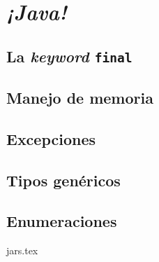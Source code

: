 \chapter{\textit{¡Java!}}
  \label{ch:java-2}
  \section{La \textit{keyword} \texttt{final}}
    \label{sec:final}
  \section{Manejo de memoria}
    \label{sec:memory}
  \section{Excepciones}
    \label{sec:exceptions}
  \section{Tipos genéricos}
    \label{sec:generics}
  \section{Enumeraciones}
    \label{sec:enum}
  {jars.tex}
  \nocite{*}
  \printbibliography[keyword=java-3]
%